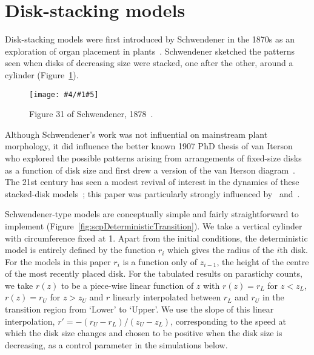 \documentclass[a4paper,10pt]{amsart}
\newlength{\jfigwidth}
\newcommand{\jpgfig}[3]{\jdofig{#1}{#2}{#3}{Figures}{.jpg}}
\newcommand{\jdofig}[5]{
	\begin{figure}\centering\texttt{[image: \#4/\#1\#5]} \caption{#2}\label{fig:#1}\end{figure}
}
\begin{document}
\section{Disk-stacking models}



 Disk-stacking models were first introduced by Schwendener in the 1870s as an exploration of organ placement in plants~\cite{schwendenerMechanischeTheorieBlattstellungen1878}.  Schwendener sketched the patterns seen when disks of decreasing size were stacked, one after the other, around a cylinder (Figure~\ref{fig:schwendener1878}).%
\jpgfig{schwendener1878}{Figure 31 of Schwendener, 1878~\cite{schwendenerMechanischeTheorieBlattstellungen1878}. 
}{.6}
%
Although Schwendener's work was not influential on mainstream plant morphology, it did influence the better known 1907 PhD thesis of van Iterson who explored the possible patterns arising from arrangements of fixed-size disks as a function of disk size and first drew a version of the van Iterson diagram~\cite{vanitersonjrMathematischeUndMikroscopischAnatomische1907,	schouteUberPseudokonchoiden1913}.
 The 21st century has seen a modest revival of interest in the dynamics of these stacked-disk models~\cite{
	atelaRhombicTilingsPrimordia2017,
	hottonPossibleActualPhyllotaxis2006,
	atelaGeometricDynamicEssence2011};  this paper was particularly strongly influenced by~\cite{goleFibonacciQuasisymmetricPhyllotaxis2016} and~\cite{goleConvergenceDiskStacking2020}. 	

Schwendener-type models are conceptually simple and fairly straightforward to implement (Figure~\ref{fig:scpDeterministicTransition}).
 We take a vertical cylinder with circumference fixed at 1. Apart from the initial conditions, the deterministic model is entirely defined by the function $r_i$ which gives the radius of the $i$th disk. For the models in this paper $r_i$ is a function only of $z_{i-1}$, the height of the centre of the most recently placed disk.
 For the tabulated results on parastichy counts, we take  $r(z)$ to be a piece-wise linear function of $z$ with $r(z)=r_L$ for $z<z_L$, $r(z)=r_U$ for $z>z_U$ and $r$ linearly interpolated between $r_L$ and  $r_U$ in the transition region from `Lower' to `Upper'. We use the slope of this linear interpolation, $r'= -(r_U-r_L)/(z_U-z_L)$, corresponding to the speed at which the disk size changes and chosen to be positive when the disk size is decreasing, as a control parameter in the simulations below.
\end{document}
